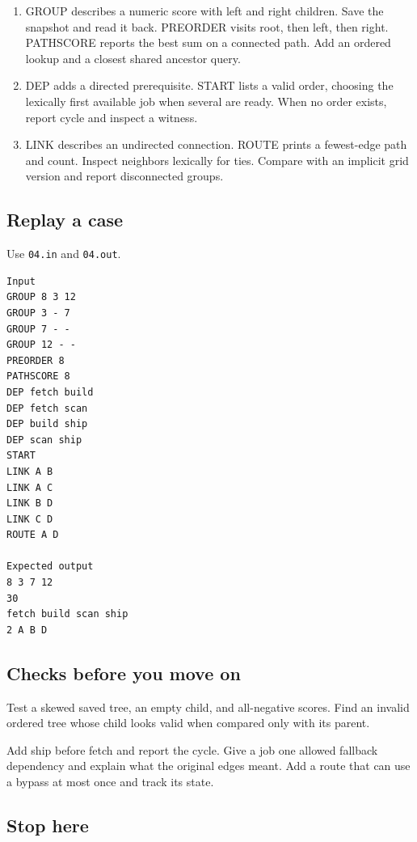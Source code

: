 \documentclass[11pt,letterpaper]{article}
\begin{document}
\begin{enumerate}
\item GROUP describes a numeric score with left and right children. Save the snapshot and read it back. PREORDER visits root, then left, then right. PATHSCORE reports the best sum on a connected path. Add an ordered lookup and a closest shared ancestor query.
\item DEP adds a directed prerequisite. START lists a valid order, choosing the lexically first available job when several are ready. When no order exists, report cycle and inspect a witness.
\item LINK describes an undirected connection. ROUTE prints a fewest-edge path and count. Inspect neighbors lexically for ties. Compare with an implicit grid version and report disconnected groups.
\end{enumerate}

\subsection*{Replay a case}

Use \texttt{04.in} and \texttt{04.out}.

\begin{samepage}
\small
\begin{verbatim}
Input
GROUP 8 3 12
GROUP 3 - 7
GROUP 7 - -
GROUP 12 - -
PREORDER 8
PATHSCORE 8
DEP fetch build
DEP fetch scan
DEP build ship
DEP scan ship
START
LINK A B
LINK A C
LINK B D
LINK C D
ROUTE A D

Expected output
8 3 7 12
30
fetch build scan ship
2 A B D
\end{verbatim}
\end{samepage}

\subsection*{Checks before you move on}

Test a skewed saved tree, an empty child, and all-negative scores. Find an invalid ordered tree whose child looks valid when compared only with its parent.

Add ship before fetch and report the cycle. Give a job one allowed fallback dependency and explain what the original edges meant. Add a route that can use a bypass at most once and track its state.

\subsection*{Stop here}
\end{document}
